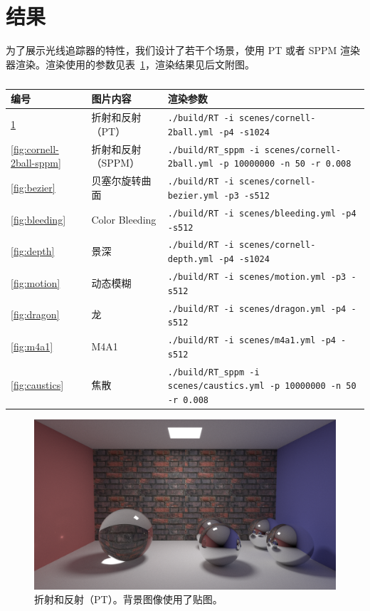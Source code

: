 \documentclass[cn]{report}
\let\t\texttt
\begin{document}
    \section{结果}
    为了展示光线追踪器的特性，我们设计了若干个场景，使用 PT 或者 SPPM 渲染器渲染。渲染使用的参数见表~\ref{tab:render-args}，渲染结果见后文附图。
    \begin{table}[htbp]
        \centering
        \small
        \begin{tabular}{lll}\toprule
            编号 & 图片内容 & 渲染参数 \\ \midrule
            \ref{fig:cornell-2ball} & 折射和反射（PT） & \t{./build/RT -i scenes/cornell-2ball.yml -p4 -s1024} \\
            \ref{fig:cornell-2ball-sppm} & 折射和反射（SPPM） & \t{./build/RT\_sppm -i scenes/cornell-2ball.yml -p 10000000 -n 50 -r 0.008} \\
            \ref{fig:bezier} & 贝塞尔旋转曲面 & \t{./build/RT -i scenes/cornell-bezier.yml -p3 -s512} \\
            \ref{fig:bleeding} & Color Bleeding & \t{./build/RT -i scenes/bleeding.yml -p4 -s512} \\
            \ref{fig:depth} & 景深 & \t{./build/RT -i scenes/cornell-depth.yml -p4 -s1024} \\
            \ref{fig:motion} & 动态模糊 & \t{./build/RT -i scenes/motion.yml -p3 -s512} \\
            \ref{fig:dragon} & 龙 & \t{./build/RT -i scenes/dragon.yml -p4 -s512} \\
            \ref{fig:m4a1} & M4A1 & \t{./build/RT -i scenes/m4a1.yml -p4 -s512} \\
            \ref{fig:caustics} & 焦散 & \t{./build/RT\_sppm -i scenes/caustics.yml -p 10000000 -n 50 -r 0.008} \\
            \bottomrule
        \end{tabular}
        \caption{}\label{tab:render-args}
    \end{table}

\ifdefined\nogallery\else
    \begin{figure}[htbp]
        \centering
        \includegraphics[width=\linewidth]{../results/cornell-2ball.png}
        \caption{折射和反射（PT）。背景图像使用了贴图。}
        \label{fig:cornell-2ball}
    \end{figure}
\end{document}
